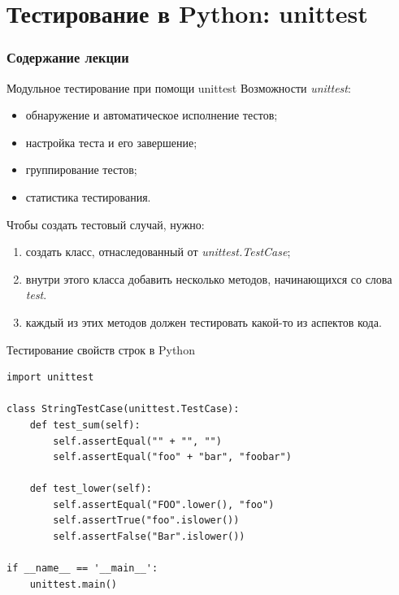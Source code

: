 \documentclass[xcolor=table]{beamer}
\begin{document}
\section{Тестирование в Python: unittest}

\begin{frame}
  \frametitle{Содержание лекции}
  \tableofcontents[current]
\end{frame}

\begin{frame}[t, fragile]{Модульное тестирование при помощи unittest}
	Возможности \textit{unittest}:
	\begin{itemize}
		\item обнаружение и автоматическое исполнение тестов;
		\item настройка теста и его завершение;
		\item группирование тестов;
		\item статистика тестирования.
	\end{itemize}
	Чтобы создать тестовый случай, нужно:
	\begin{enumerate}
		\item создать класс, отнаследованный от \textit{unittest.TestCase};
		\item внутри этого класса добавить несколько методов, начинающихся со слова \textit{test}.
		\item каждый из этих методов должен тестировать какой-то из аспектов кода.
	\end{enumerate}
\end{frame}

\begin{frame}[t, fragile]{Тестирование свойств строк в Python}
	\begin{verbatim}    
import unittest

class StringTestCase(unittest.TestCase):
    def test_sum(self):
        self.assertEqual("" + "", "")
        self.assertEqual("foo" + "bar", "foobar")

    def test_lower(self):
        self.assertEqual("FOO".lower(), "foo")
        self.assertTrue("foo".islower())
        self.assertFalse("Bar".islower())
       
if __name__ == '__main__':
    unittest.main()        
	\end{verbatim}
\end{frame}
\end{document}
